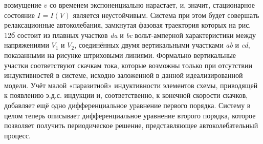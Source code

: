 \documentclass[]{article}
\begin{document}
возмущение \(v\) со временем экспоненциально нарастает, и, значит,
стационарное состояние \({{I}_{\text{}}}=I({{V}_{\text{}}})\) является
неустойчивым. Система при этом будет совершать {релаксационные
автоколебания}, замкнутая фазовая траектория которых на рис. 12б состоит
из плавных участков \emph{da} и \emph{bc} вольт-амперной характеристики
между напряжениями \(V_1\) и \(V_2\), соединённых двумя вертикальными
участками \emph{ab} и \emph{cd}, показанными на рисунке штриховыми
линиями. Формально вертикальные участки соответствуют {скачкам тока},
которые возможны только при отсутствии индуктивностей в системе, исходно
заложенной в данной идеализированной модели. Учёт малой «паразитной»
индуктивности элементов схемы, приводящей к появлению э.д.с. индукции и,
соответственно, к конечной скорости скачков, добавляет ещё одно
дифференциальное уравнение первого порядка. Систему в целом теперь
описывает дифференциальное уравнение второго порядка, которое позволяет
получить периодическое решение, представляющее автоколебательный
процесс.
\end{document}
